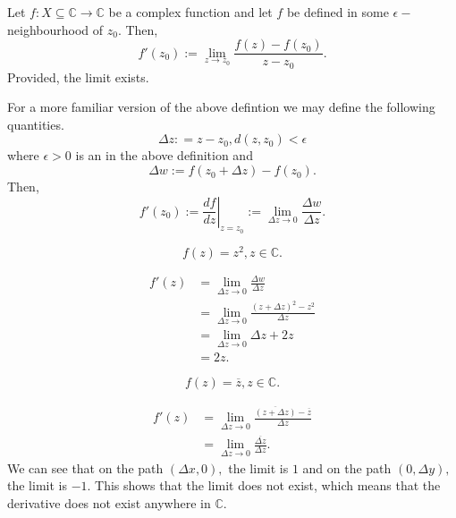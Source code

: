 \documentclass[12pt]{book}
\begin{document}
\begin{defn}[Derivative]
    Let $f: X \subseteq \mathbb{C} \rightarrow \mathbb{C}$ be a complex function and let $f$ be defined in some $\epsilon-$neighbourhood of $z_0$. Then,
    $$
        f'(z_0) := \lim_{z \rightarrow z_0} \frac{f(z) - f(z_0)}{z - z_0}.
    $$
    Provided, the limit exists.
\end{defn}
For a more familiar version of the above defintion we may define the following quantities.
$$
    \Delta z: = z - z_0, d(z, z_0) < \epsilon
$$
where $\epsilon > 0$ is an in the above definition and 
$$
    \Delta w := f(z_0 + \Delta z) - f(z_0).
$$ 
Then,
$$
    f'(z_0) := \left.\frac{df}{dz}\right|_{z = z_0} := \lim_{\Delta z \rightarrow 0} \frac{\Delta w}{\Delta z}.
$$

\begin{exmp}
    $$
        f(z) = z^2, z \in \mathbb{C}.
    $$
\end{exmp}
\begin{align*}
    f'(z)
        &= 
            \lim_{\Delta z \rightarrow 0} \frac{\Delta w}{\Delta z} \\
        &= 
            \lim_{\Delta z \rightarrow 0} \frac{(z + \Delta z)^2 - z^2}{\Delta z} \\
        &=
            \lim_{\Delta z \rightarrow 0} \Delta z + 2z \\
        &=
            2z.
\end{align*}

\begin{exmp}
    $$
        f(z) = \overline{z}, z \in \mathbb{C}.
    $$
\end{exmp}
\begin{align*}
    f'(z)
        &=
            \lim_{\Delta z \rightarrow 0} \frac{\overline{(z + \Delta z)} - \overline{z}}{\Delta z} \\
        &=
            \lim_{\Delta z \rightarrow 0} \frac{\overline{\Delta z}}{\Delta z}.
\end{align*}
We can see that on the path $(\Delta x, 0),$ the limit is $1$ and on the path $(0, \Delta y),$ the limit is $-1$. This shows that the limit does not exist, which means that the derivative does not exist anywhere in $\mathbb{C}.$
\end{document}
